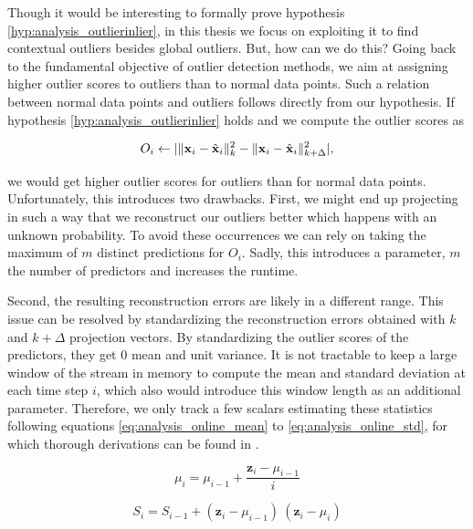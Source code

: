 Though it would be interesting to formally prove hypothesis \ref{hyp:analysis_outlierinlier}, in this thesis we focus on exploiting it to find contextual outliers besides global outliers. But, how can we do this?
Going back to the fundamental objective of outlier detection methods, we aim at assigning higher outlier scores to outliers than to normal data points. Such a relation between normal data points and outliers follows directly from our hypothesis. If hypothesis \ref{hyp:analysis_outlierinlier} holds and we compute the outlier scores as 

\begin{equation}\label{eq:hypothesis_outlierscores}
	O_i \gets |\| \mathbf{x}_i - \hat{\mathbf{x}}_i \|^2_{k} - \| \mathbf{x}_i - \hat{\mathbf{x}}_i \|^2_{k+\Delta}|,
\vspace{0.1cm}
\end{equation}

\noindent we would get higher outlier scores for outliers than for normal data points.\\
Unfortunately, this introduces two drawbacks. First, we might end up projecting in such a way that we reconstruct our outliers better which happens with an unknown probability. To avoid these occurrences we can rely on taking the maximum of $m$ distinct predictions for $O_i$. Sadly, this introduces a parameter, $m$ the number of predictors and increases the runtime. 

Second, the resulting reconstruction errors are likely in a different range. This issue can be resolved by standardizing the reconstruction errors obtained with $k$ and $k+\Delta$ projection vectors. By standardizing the outlier scores of the predictors, they get $0$ mean and unit variance. It is not tractable to keep a large window of the stream in memory to compute the mean and standard deviation at each time step $i$, which also would introduce this window length as an additional parameter. Therefore, we only track a few scalars estimating these statistics following equations \eqref{eq:analysis_online_mean} to \eqref{eq:analysis_online_std}, for which thorough derivations can be found in \cite{finch2009incremental}.


\begin{equation}\label{eq:analysis_online_mean}
	\mu_i = \mu_{i-1} + \frac{\mathbf{z}_i - \mu_{i-1}}{i}
\end{equation}

\begin{equation}\label{eq:analysis_online_var}
	S_i = S_{i-1} + (\mathbf{z}_i - \mu_{i-1}) \ (\mathbf{z}_i - \mu_i)
\end{equation}

